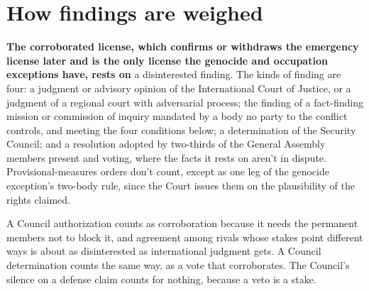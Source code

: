 \section{How findings are weighed}
\label{sec:E.1}
\textbf{The corroborated license, which confirms or withdraws the emergency license later and is the only license the genocide and occupation exceptions have, rests on} a disinterested finding. The kinds of finding are four: a judgment or advisory opinion of the International Court of Justice, or a judgment of a regional court with adversarial process; the finding of a fact-finding mission or commission of inquiry mandated by a body no party to the conflict controls, and meeting the four conditions below; a determination of the Security Council; and a resolution adopted by two-thirds of the General Assembly members present and voting, where the facts it rests on aren't in dispute. Provisional-measures orders don't count, except as one leg of the genocide exception's two-body rule, since the Court issues them on the plausibility of the rights claimed.

A Council authorization counts as corroboration because it needs the permanent members not to block it, and agreement among rivals whose stakes point different ways is about as disinterested as international judgment gets. A Council determination counts the same way, as a vote that corroborates. The Council's silence on a defense claim counts for nothing, because a veto is a stake.

